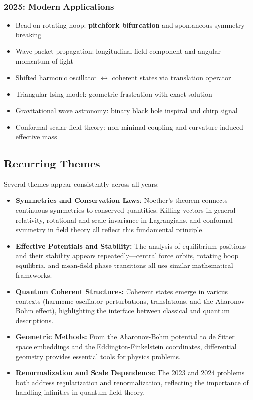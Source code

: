 \subsubsection*{2025: Modern Applications}
\begin{itemize}
    \item Bead on rotating hoop: \textbf{pitchfork bifurcation} and spontaneous symmetry breaking
    \item Wave packet propagation: longitudinal field component and angular momentum of light
    \item Shifted harmonic oscillator $\leftrightarrow$ coherent states via translation operator
    \item Triangular Ising model: geometric frustration with exact solution
    \item Gravitational wave astronomy: binary black hole inspiral and chirp signal
    \item Conformal scalar field theory: non-minimal coupling and curvature-induced effective mass
\end{itemize}

\subsection{Recurring Themes}

Several themes appear consistently across all years:

\begin{itemize}
\item \textbf{Symmetries and Conservation Laws:} Noether's theorem connects continuous symmetries to conserved quantities. Killing vectors in general relativity, rotational and scale invariance in Lagrangians, and conformal symmetry in field theory all reflect this fundamental principle.

\item \textbf{Effective Potentials and Stability:} The analysis of equilibrium positions and their stability appears repeatedly---central force orbits, rotating hoop equilibria, and mean-field phase transitions all use similar mathematical frameworks.

\item \textbf{Quantum Coherent Structures:} Coherent states emerge in various contexts (harmonic oscillator perturbations, translations, and the Aharonov-Bohm effect), highlighting the interface between classical and quantum descriptions.

\item \textbf{Geometric Methods:} From the Aharonov-Bohm potential to de Sitter space embeddings and the Eddington-Finkelstein coordinates, differential geometry provides essential tools for physics problems.

\item \textbf{Renormalization and Scale Dependence:} The 2023 and 2024 problems both address regularization and renormalization, reflecting the importance of handling infinities in quantum field theory.
\end{itemize}

